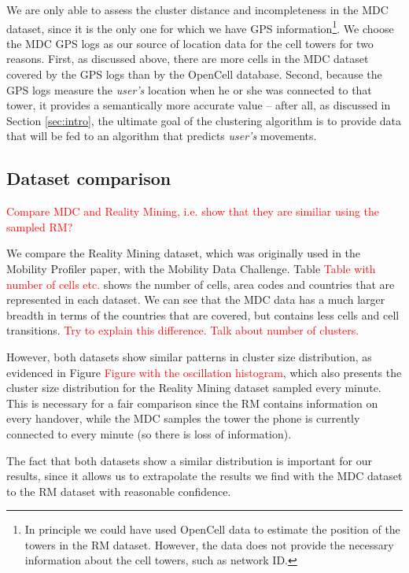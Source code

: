 \documentclass[letterpaper, 11pt, conference]{ieeeconf}
\newcommand{\xxx}[1]{\textcolor{red}{#1}}
\begin{document}
We are only able to assess the cluster distance and incompleteness in the MDC dataset, since it is the only one for which we have GPS information\footnote{In principle we could have used OpenCell data to estimate the position of the towers in the RM dataset. However, the data does not provide the necessary information about the cell towers, such as network ID.}. We choose the MDC GPS logs as our source of location data for the cell towers for two reasons. First, as discussed above, there are more cells in the MDC dataset covered by the GPS logs than by the OpenCell database. Second, because the GPS logs measure the \textit{user's} location when he or she was connected to that tower, it provides a semantically more accurate value -- after all, as discussed in Section \ref{sec:intro}, the ultimate goal of the clustering algorithm is to provide data that will be fed to an algorithm that predicts \textit{user's} movements.

\subsection{Dataset comparison}


\xxx{Compare MDC and Reality Mining, i.e. show that they are similiar using the sampled RM?}

We compare the Reality Mining dataset, which was originally used in the Mobility Profiler paper, with the Mobility Data Challenge. Table \xxx{Table with number of cells etc.} shows the number of cells, area codes and countries that are represented in each dataset. We can see that the MDC data has a much larger breadth in terms of the countries that are covered, but contains less cells and cell transitions. \xxx{Try to explain this difference. Talk about number of clusters.}

However, both datasets show similar patterns in cluster size distribution, as evidenced in Figure \xxx{Figure with the oscillation histogram}, which also presents the cluster size distribution for the Reality Mining dataset sampled every minute. This is necessary for a fair comparison since the RM contains information on every handover, while the MDC samples the tower the phone is currently connected to every minute (so there is loss of information).

The fact that both datasets show a similar distribution is important for our results, since it allows us to extrapolate the results we find with the MDC dataset to the RM dataset with reasonable confidence.
\end{document}
